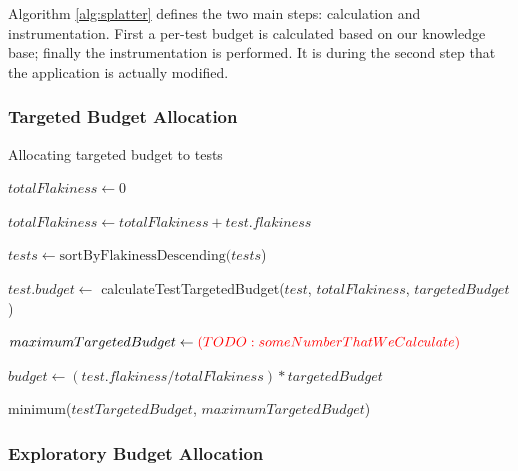 Algorithm \ref{alg:splatter} defines the two main steps: calculation and instrumentation. First a per-test budget is calculated based on our knowledge base; finally the instrumentation is performed. It is during the second step that the application is actually modified.


\subsubsection{Targeted Budget Allocation}

\begin{algorithm}[H]
\caption{Allocating targeted budget to tests}
\label{alg:allocateTargetedBudget}
\begin{algorithmic}

	\State $totalFlakiness \gets 0$

		\State $totalFlakiness \gets totalFlakiness + test.flakiness$
	\EndFor
	\Statex

	\State $tests \gets \text{sortByFlakinessDescending(}tests$)

		\State $test.budget \gets$ calculateTestTargetedBudget($test$, $totalFlakiness$, $targetedBudget$)
	\EndFor

	\EndFunction
	\Statex

	\State $maximumTargetedBudget \gets {\color{red}(TODO: someNumberThatWeCalculate)}$

	\State $budget \gets (test.flakiness / totalFlakiness) * targetedBudget$
	\Statex

	\Return minimum($testTargetedBudget$, $maximumTargetedBudget$)

	\EndFunction
\end{algorithmic}
\end{algorithm}

\subsubsection{Exploratory Budget Allocation}


